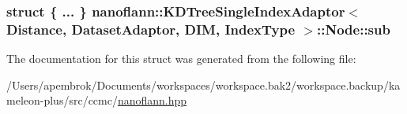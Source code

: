 \hypertarget{structnanoflann_1_1_k_d_tree_single_index_adaptor_1_1_node_a0f18e3c2f42717cce686aeb378f77a21}{
\subsubsection[{sub}]{\setlength{\rightskip}{0pt plus 5cm}struct \{ ... \}   {\bf nanoflann\-::\-K\-D\-Tree\-Single\-Index\-Adaptor}$<$ Distance, Dataset\-Adaptor, D\-I\-M, Index\-Type $>$\-::Node\-::sub}}\label{structnanoflann_1_1_k_d_tree_single_index_adaptor_1_1_node_a0f18e3c2f42717cce686aeb378f77a21}


The documentation for this struct was generated from the following file\-:\begin{DoxyCompactItemize}
\item 
/\-Users/apembrok/\-Documents/workspaces/workspace.\-bak2/workspace.\-backup/kameleon-\/plus/src/ccmc/\hyperlink{nanoflann_8hpp}{nanoflann.\-hpp}\end{DoxyCompactItemize}
